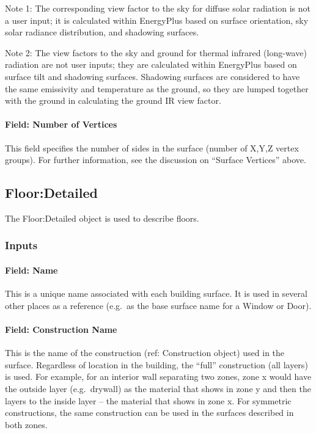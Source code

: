 Note 1: The corresponding view factor to the sky for diffuse solar radiation is not a user input; it is calculated within EnergyPlus based on surface orientation, sky solar radiance distribution, and shadowing surfaces.

Note 2: The view factors to the sky and ground for thermal infrared (long-wave) radiation are not user inputs; they are calculated within EnergyPlus based on surface tilt and shadowing surfaces. Shadowing surfaces are considered to have the same emissivity and temperature as the ground, so they are lumped together with the ground in calculating the ground IR view factor.

\paragraph{Field: Number of Vertices}\label{field-number-of-vertices-1}

This field specifies the number of sides in the surface (number of X,Y,Z vertex groups). For further information, see the discussion on ``Surface Vertices'' above.

\subsection{Floor:Detailed}\label{floordetailed}

The Floor:Detailed object is used to describe floors.

\subsubsection{Inputs}\label{inputs-22-006}

\paragraph{Field: Name}\label{field-name-18-008}

This is a unique name associated with each building surface. It is used in several other places as a reference (e.g.~as the base surface name for a Window or Door).

\paragraph{Field: Construction Name}\label{field-construction-name-18}

This is the name of the construction (ref: Construction object) used in the surface. Regardless of location in the building, the ``full'' construction (all layers) is used. For example, for an interior wall separating two zones, zone x would have the outside layer (e.g.~drywall) as the material that shows in zone y and then the layers to the inside layer -- the material that shows in zone x. For symmetric constructions, the same construction can be used in the surfaces described in both zones.

